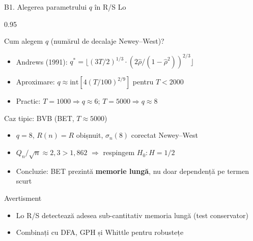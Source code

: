 \documentclass[9pt, aspectratio=169, t]{beamer}
\begin{document}
\begin{frame}[shrink=15]{B1. Alegerea parametrului $q$ în R/S Lo}
\begin{cminipage}{0.95\textwidth}
\begin{block}{Cum alegem $q$ (numărul de decalaje Newey--West)?}
\begin{itemize}\setlength{\itemsep}{0pt}
    \item Andrews (1991): $q^*=\lfloor (3T/2)^{1/3}\cdot(2\hat\rho/(1-\hat\rho^2))^{2/3}\rfloor$
    \item Aproximare: $q\approx \text{int}[4(T/100)^{2/9}]$ pentru $T<2000$
    \item Practic: $T=1000\Rightarrow q\approx 6$; $T=5000\Rightarrow q\approx 8$
\end{itemize}
\end{block}
\begin{exampleblock}{Caz tipic: BVB (BET, $T\approx 5000$)}
\begin{itemize}\setlength{\itemsep}{0pt}
    \item $q=8$, $R(n)=R$ obișnuit, $\sigma_n(8)$ corectat Newey--West
    \item $Q_n/\sqrt n\approx 2{,}3>1{,}862$ $\Rightarrow$ respingem $H_0:H=1/2$
    \item Concluzie: BET prezintă \textbf{memorie lungă}, nu doar dependență pe termen scurt
\end{itemize}
\end{exampleblock}
\begin{alertblock}{Avertisment}
\begin{itemize}\setlength{\itemsep}{0pt}
    \item Lo R/S detectează adesea sub-cantitativ memoria lungă (test conservator)
    \item Combinați cu DFA, GPH și Whittle pentru robustețe
\end{itemize}
\end{alertblock}
\end{cminipage}
\end{frame}
\end{document}
